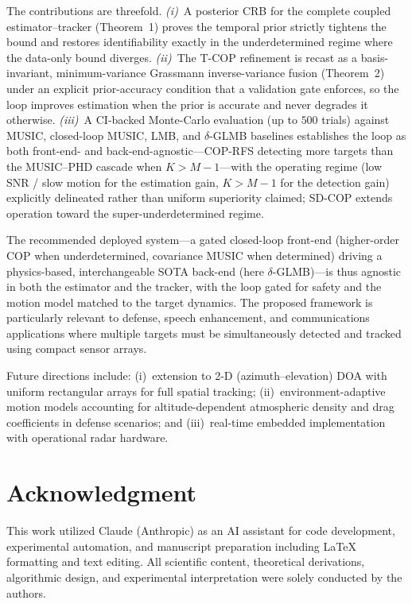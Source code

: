 \documentclass[journal]{IEEEtran}
\begin{document}
The contributions are threefold. \emph{(i)}~A posterior CRB for the complete coupled estimator--tracker (Theorem~1) proves the temporal prior strictly tightens the bound and restores identifiability exactly in the underdetermined regime where the data-only bound diverges. \emph{(ii)}~The T-COP refinement is recast as a basis-invariant, minimum-variance Grassmann inverse-variance fusion (Theorem~2) under an explicit prior-accuracy condition that a validation gate enforces, so the loop improves estimation when the prior is accurate and never degrades it otherwise. \emph{(iii)}~A CI-backed Monte-Carlo evaluation (up to $500$ trials) against MUSIC, closed-loop MUSIC, LMB, and $\delta$-GLMB baselines establishes the loop as both front-end- and back-end-agnostic---COP-RFS detecting more targets than the MUSIC--PHD cascade when $K>M{-}1$---with the operating regime (low SNR / slow motion for the estimation gain, $K>M{-}1$ for the detection gain) explicitly delineated rather than uniform superiority claimed; SD-COP extends operation toward the super-underdetermined regime.

The recommended deployed system---a gated closed-loop front-end (higher-order COP when underdetermined, covariance MUSIC when determined) driving a physics-based, interchangeable SOTA back-end (here $\delta$-GLMB)---is thus agnostic in both the estimator and the tracker, with the loop gated for safety and the motion model matched to the target dynamics. The proposed framework is particularly relevant to defense, speech enhancement, and communications applications where multiple targets must be simultaneously detected and tracked using compact sensor arrays.

Future directions include: (i)~extension to 2-D (azimuth--elevation) DOA with uniform rectangular arrays for full spatial tracking; (ii)~environment-adaptive motion models accounting for altitude-dependent atmospheric density and drag coefficients in defense scenarios; and (iii)~real-time embedded implementation with operational radar hardware.

\section*{Acknowledgment}
This work utilized Claude (Anthropic) as an AI assistant for code development, experimental automation, and manuscript preparation including \LaTeX{} formatting and text editing. All scientific content, theoretical derivations, algorithmic design, and experimental interpretation were solely conducted by the authors.



\end{document}
